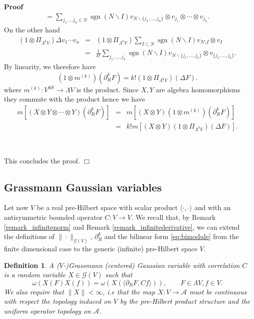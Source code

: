 \documentclass{article}
\newcommand{\tmop}[1]{\ensuremath{\operatorname{#1}}}
\newenvironment{proof}{\noindent\textbf{Proof\ }}{\hspace*{\fill}$\Box$\medskip}
\newtheorem{definition}[theorem]{Definition}
\begin{document}
\begin{proof}
\[\begin{array}{c}
       = \sum_{j_1, \ldots j_n \in N} \tmop{sgn} (N\backslash I)
       v_{N\backslash \{ j_1, \ldots, j_n \}} \otimes v_{j_1} \otimes \cdots
       \otimes v_{j_n} .
     \end{array} \]
  On the other hand
  \[ \begin{array}{lll}
       (1 \otimes \Pi_{\Lambda^k V}) \Delta v_1 \cdots v_n & = & (1 \otimes
       \Pi_{\Lambda^k V}) \sum_{I \subset N} \tmop{sgn} (N\backslash I) v_{N
       \setminus I} \otimes v_I\\
       & = & \frac{1}{k!} \sum_{j_1, \ldots, j_k} \tmop{sgn} (N\backslash I)
       v_{N\backslash \{ j_1, \ldots, j_k \}} \otimes v_{\{ j_1, \ldots, j_k
       \}} .
     \end{array} \]
  By linearity, we therefore have
  \[ (1 \otimes m^{(k)}) (\partial^k_R F) = k! (1 \otimes \Pi_{\Lambda^k V})
     (\Delta F) . \]
  where $m^{(k)} : V^{\otimes k} \rightarrow \Lambda V$ is the product. Since
  $X, Y$ are algebra homomorphisms they commute with the product hence we have
  \begin{eqnarray*}
    m [(X \otimes Y \otimes \cdots \otimes Y) (\partial_R^k F)] & = & m [(X
    \otimes Y) (1 \otimes m^{(k)}) (\partial_R^k F)]\\
    & = & k!m [(X \otimes Y) (1 \otimes \Pi_{\Lambda^k V}) (\Delta F)] .
  \end{eqnarray*}
  
  
  \
  
  This concludes the proof.
\end{proof}

\subsection{Grassmann Gaussian variables}\label{sec:gaussians}

Let now $V$ be a real pre-Hilbert space with scalar product $\langle \cdot,
\cdot \rangle$ and with an antisymmetric bounded operator $C : V \rightarrow
V$. We recall that, by Remark \ref{remark_infinitenorm} and Remark
\ref{remark_infinitederivative}, we can extend the definitions of $\| \cdot
\|_{\mathcal{G} (V)}$, $\partial_R^k$ and the bilinear form
{\eqref{eq:bimodule}} from the finite dimensional case to the generic
(infinite) pre-Hilbert space $V$.

\begin{definition}
  A ($V$-)Grassmann (centered) Gaussian variable with correlation $C$ is a
  random variable $X \in \mathcal{G} (V)$ such that
  \begin{equation}
    \omega (X (F) X (f)) = \omega (X (\langle \partial_R F, C f \rangle)),
    \qquad F \in \Lambda V, f \in V. \label{eq:ibp-r}
  \end{equation}
  We also require that $\| X \| < \infty$, i.e that the map $X : V \rightarrow
  \mathcal{A}$ must be continuous with respect the topology induced on $V$ by
  the pre-Hilbert product structure and the uniform operator topology on
  $\mathcal{A}$.
\end{definition}
\end{document}
